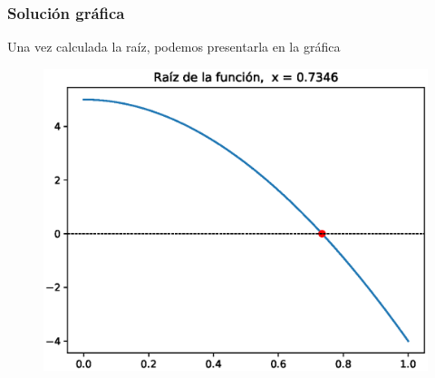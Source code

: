 \documentclass[12pt]{beamer}
\begin{document}
\begin{frame}[fragile]
\frametitle{Solución gráfica}
Una vez calculada la raíz, podemos presentarla en la gráfica
\begin{figure}
	\centering
	\includegraphics[scale=0.5]{Imagenes/Ejercicio_4_2_02_Libro.eps}
\end{figure}
\end{frame}
\end{document}
